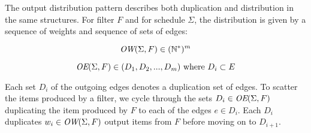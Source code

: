 The output distribution pattern describes both duplication and
distribution in the same structures. For filter $F$ and for schedule
$\Sigma$, the distribution is given by a sequence of weights and
sequence of sets of edges:

\[ \mbox{\it OW}(\Sigma, F)  \in (\mathbb{N}^{*})^m \]

\[ \mbox{\it OE}(\Sigma, F) \in (D_1, D_2, ..., D_m)  \mbox{ where }  D_i \subset
E \]

Each set $D_i$ of the outgoing edges denotes a duplication set of
edges. To scatter the items produced by a filter, we cycle through the
sets $D_i \in \mbox{\it OE}(\Sigma, F)$ duplicating the item produced by $F$
to each of the edges $e \in D_i$. Each $D_i$ duplicates $w_i \in
\mbox{\it OW}(\Sigma, F)$ output items from $F$ before moving on to
$D_{i+1}$.

